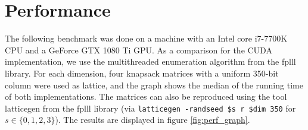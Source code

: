 \documentclass{scrartcl}
\begin{document}
    \section{Performance}


    The following benchmark was done on a machine with an Intel core i7-7700K CPU and a GeForce GTX 1080 Ti GPU. As a comparison for the CUDA implementation, we use the multithreaded enumeration algorithm from the fplll library.
    For each dimension, four knapsack matrices with a uniform 350-bit column were used as lattice, and the graph shows the median of the running time of both implementations. The matrices can also be reproduced using the tool latticegen from the fplll library (via \texttt{latticegen -randseed \$s r \$dim 350} for $s \in \{0, 1, 2, 3\}$).
    The results are displayed in figure \ref{fig:perf_graph}.
\end{document}
